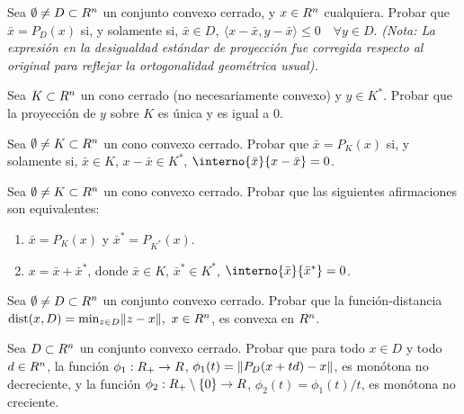 \begin{exercise}\label{v1:ejer:3.2.11}
 Sea $\emptyset \neq D \subset R^n$ un conjunto convexo cerrado, y $x \in R^n$ cualquiera. Probar que $\bar{x} = P_D(x)$ si, y solamente si, $\bar{x} \in D, \ \langle x - \bar{x}, y - \bar{x} \rangle \le 0 \quad \forall y \in D$. \textit{(Nota: La expresión en la desigualdad estándar de proyección fue corregida respecto al original para reflejar la ortogonalidad geométrica usual).}
\end{exercise}

\begin{exercise}\label{v1:ejer:3.2.12}
 Sea $K \subset R^n$ un cono cerrado (no necesariamente convexo) y $y \in K^*$. Probar que la proyección de $y$ sobre $K$ es única y es igual a 0.
\end{exercise}

\begin{exercise}\label{v1:ejer:3.2.13}
 Sea $\emptyset \neq K \subset R^n$ un cono convexo cerrado. Probar que $\bar{x} = P_K(x)$ si, y solamente si, $\bar{x} \in K$, $x - \bar{x} \in K^*$, $\interno{\bar{x}}{x - \bar{x}} = 0$.
\end{exercise}

\begin{exercise}\label{v1:ejer:3.2.14}
 Sea $\emptyset \neq K \subset R^n$ un cono convexo cerrado. Probar que las siguientes afirmaciones son equivalentes:
 \begin{enumerate}[label=(\alph*)]
  \item $\bar{x} = P_K(x)$ y $\bar{x}^* = P_{K^*}(x)$.
  \item $x = \bar{x} + \bar{x}^*$, donde $\bar{x} \in K$, $\bar{x}^* \in K^*$, $\interno{\bar{x}}{\bar{x}^*} = 0$.
 \end{enumerate}
\end{exercise}

\begin{exercise}\label{v1:ejer:3.2.15}
 Sea $\emptyset \neq D \subset R^n$ un conjunto convexo cerrado. Probar que la función-distancia $\operatorname{dist}(x, D) = \min_{z \in D} \lVert z - x\rVert, \ x \in R^n$, es convexa en $R^n$.
\end{exercise}

\begin{exercise}\label{v1:ejer:3.2.16}
 Sea $D \subset R^n$ un conjunto convexo cerrado. Probar que para todo $x \in D$ y todo $d \in R^n$, la función $\phi_1 : R_+ \to R$, $\phi_1(t) = \lVert P_D(x + td) - x\rVert$, es monótona no decreciente, y la función $\phi_2 : R_+ \setminus \{0\} \to R$, $\phi_2(t) = \phi_1(t)/t$, es monótona no creciente.
\end{exercise}


